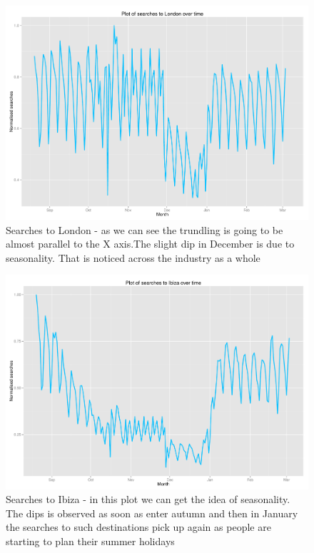 \documentclass[minf,frontabs,twoside,singlespacing,parskip]{infthesis}
\begin{document}
\begin{figure}[]
\begin{center}
\includegraphics[scale=0.4]{london-searches}
\end{center}
\caption{Searches to London - as we can see the trundling is going to be almost parallel to the X axis.The slight dip in December is due to seasonality. That is noticed across the industry as a whole}
\label{london-searches}
\end{figure}


\begin{figure}[]
\begin{center}
\includegraphics[scale=0.4]{ibiza-searches}
\end{center}
\caption{Searches to Ibiza - in this plot we can get the idea of seasonality. The dips is observed as soon as enter autumn and then in January the searches to such destinations pick up again as people are starting to plan their summer holidays}
\label{ibiza-searches}
\end{figure}
\end{document}
